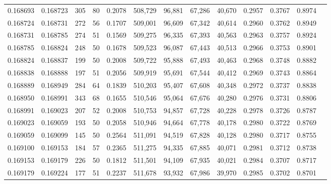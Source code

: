 \begin{tabular}{rrrrrrrrrrrrr}
0.168693 & 0.168723 &   305 &  80 &                                     0.2078 & 508,729 &  96,881 &  67,286 &  40,670 & 0.2957 & 0.3767 & 0.8974 \\
0.168724 & 0.168731 &   272 &  56 &                                     0.1707 & 509,001 &  96,609 &  67,342 &  40,614 & 0.2960 & 0.3762 & 0.8949 \\
0.168731 & 0.168785 &   274 &  51 &                                     0.1569 & 509,275 &  96,335 &  67,393 &  40,563 & 0.2963 & 0.3757 & 0.8924 \\
0.168785 & 0.168824 &   248 &  50 &                                     0.1678 & 509,523 &  96,087 &  67,443 &  40,513 & 0.2966 & 0.3753 & 0.8901 \\
0.168824 & 0.168837 &   199 &  50 &                                     0.2008 & 509,722 &  95,888 &  67,493 &  40,463 & 0.2968 & 0.3748 & 0.8882 \\
0.168838 & 0.168888 &   197 &  51 &                                     0.2056 & 509,919 &  95,691 &  67,544 &  40,412 & 0.2969 & 0.3743 & 0.8864 \\
0.168889 & 0.168949 &   284 &  64 &                                     0.1839 & 510,203 &  95,407 &  67,608 &  40,348 & 0.2972 & 0.3737 & 0.8838 \\
0.168950 & 0.168991 &   343 &  68 &                                     0.1655 & 510,546 &  95,064 &  67,676 &  40,280 & 0.2976 & 0.3731 & 0.8806 \\
0.168991 & 0.169023 &   207 &  52 &                                     0.2008 & 510,753 &  94,857 &  67,728 &  40,228 & 0.2978 & 0.3726 & 0.8787 \\
0.169023 & 0.169059 &   193 &  50 &                                     0.2058 & 510,946 &  94,664 &  67,778 &  40,178 & 0.2980 & 0.3722 & 0.8769 \\
0.169059 & 0.169099 &   145 &  50 &                                     0.2564 & 511,091 &  94,519 &  67,828 &  40,128 & 0.2980 & 0.3717 & 0.8755 \\
0.169100 & 0.169153 &   184 &  57 &                                     0.2365 & 511,275 &  94,335 &  67,885 &  40,071 & 0.2981 & 0.3712 & 0.8738 \\
0.169153 & 0.169179 &   226 &  50 &                                     0.1812 & 511,501 &  94,109 &  67,935 &  40,021 & 0.2984 & 0.3707 & 0.8717 \\
0.169179 & 0.169224 &   177 &  51 &                                     0.2237 & 511,678 &  93,932 &  67,986 &  39,970 & 0.2985 & 0.3702 & 0.8701 \\

\end{tabular}
